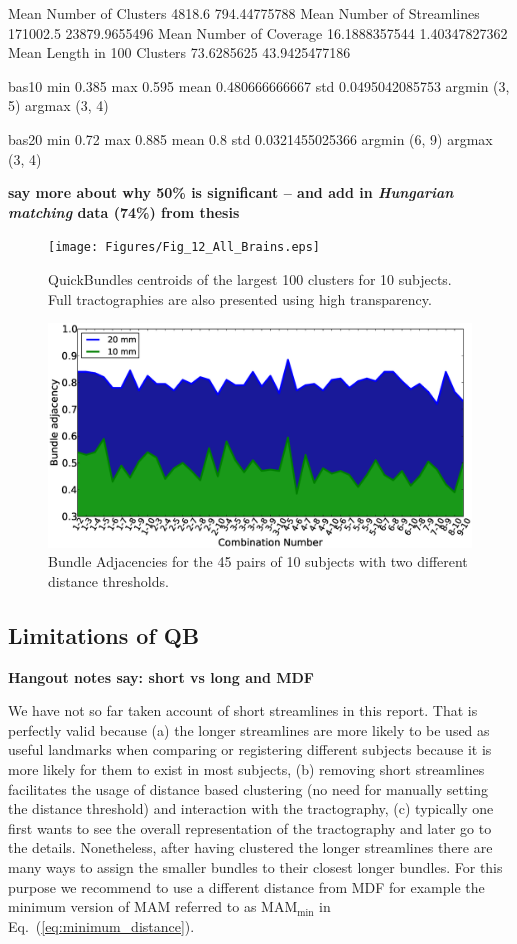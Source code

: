 \documentclass{bioinfo}
\begin{document}
Mean Number of Clusters 4818.6 794.44775788
Mean Number of Streamlines 171002.5 23879.9655496
Mean Number of Coverage 16.1888357544 1.40347827362
Mean Length in 100 Clusters 73.6285625 43.9425477186

bas10
min 0.385 max 0.595 mean 0.480666666667 std 0.0495042085753
argmin (3, 5)
argmax (3, 4)

bas20
min 0.72 max 0.885 mean 0.8 std 0.0321455025366
argmin (6, 9)
argmax (3, 4)


\textbf{say more about why 50\% is significant -- and add in
  \textit{Hungarian matching} data (74\%) from thesis}

\begin{figure}[htp]
\centerline{\texttt{[image: Figures/Fig\_12\_All\_Brains.eps]}}
\caption{QuickBundles centroids of the largest 100 clusters for 10 subjects. Full tractographies are also presented using high transparency. \label{Flo:BAs}}
\end{figure}

\begin{figure}
\centerline{\includegraphics[scale=0.24]{Figures/Fig_13_BAs}}
\caption{Bundle Adjacencies for the 45 pairs of 10 subjects with two different distance thresholds. \label{Flo:BAs_plot}}
\end{figure}



\subsection{Limitations of QB\label{sub:short_tracks}}

\textbf{Hangout notes say: short vs long and MDF}

We have not so far taken account of short streamlines in this
report. That is perfectly valid because (a) the longer streamlines are
more likely to be used as useful landmarks when comparing or registering
different subjects because it is more likely for them to exist in most
subjects, (b) removing short streamlines facilitates the usage of
distance based clustering (no need for manually setting the distance
threshold) and interaction with the tractography, (c) typically one
first wants to see the overall representation of the tractography and
later go to the details. Nonetheless, after having clustered the longer
streamlines there are many ways to assign the smaller bundles to their
closest longer bundles. For this purpose we recommend to use a different
distance from MDF for example the minimum version of MAM referred to as
$\textrm{MAM}_{\textrm{min}}$ in Eq.~(\ref{eq:minimum_distance}).
\end{document}
